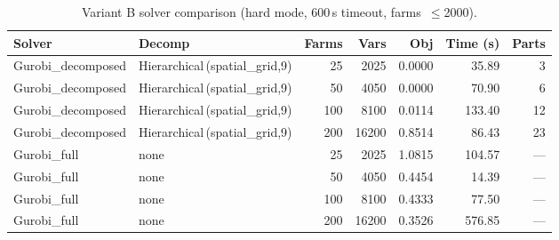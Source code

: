 \begin{table}[htbp]
\centering
\caption{Variant B solver comparison (hard mode, 600\,s timeout, farms~$\le$2000).}
\label{tab:variant_B_full}
\begin{tabular}{llrrrrr}
\toprule
    \textbf{Solver} & \textbf{Decomp} & \textbf{Farms} & \textbf{Vars} & \textbf{Obj} & \textbf{Time (s)} & \textbf{Parts} \\ \midrule
    Gurobi\_decomposed & Hierarchical\,(spatial\_grid,9) & 25 & 2025 & 0.0000 & 35.89 & 3 \\
    Gurobi\_decomposed & Hierarchical\,(spatial\_grid,9) & 50 & 4050 & 0.0000 & 70.90 & 6 \\
    Gurobi\_decomposed & Hierarchical\,(spatial\_grid,9) & 100 & 8100 & 0.0114 & 133.40 & 12 \\
    Gurobi\_decomposed & Hierarchical\,(spatial\_grid,9) & 200 & 16200 & 0.8514 & 86.43 & 23 \\
    Gurobi\_full & none & 25 & 2025 & 1.0815 & 104.57 & — \\
    Gurobi\_full & none & 50 & 4050 & 0.4454 & 14.39 & — \\
    Gurobi\_full & none & 100 & 8100 & 0.4333 & 77.50 & — \\
    Gurobi\_full & none & 200 & 16200 & 0.3526 & 576.85 & — \\
\bottomrule
\end{tabular}

\end{table}
